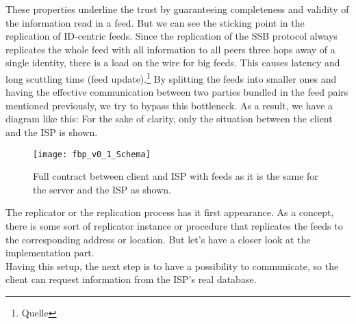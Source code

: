 These properties underline the trust by guaranteeing completeness and validity of the information read in a feed. But we can see the sticking point in the replication of ID-centric feeds. Since the replication of the SSB protocol always replicates the whole feed with all information to all peers three hops away of a single identity, there is a load on the wire for big feeds. This causes latency and long scuttling time (feed update).\footnote{Quelle} By splitting the feeds into smaller ones and having the effective communication between two parties bundled in the feed pairs mentioned previously, we try to bypass this bottleneck. As a result, we have a diagram like this: For the sake of clarity, only the situation between the client and the ISP is shown. 

\begin{figure}
    \centering
    \texttt{[image: fbp\_v0\_1\_Schema]}
    \caption{Full contract between client and ISP with feeds as it is the same for the server and the ISP as shown.}
    \label{fig:contract_cli_isp}
\end{figure}
The replicator or the replication process has it first appearance. As a concept, there is some sort of replicator instance or procedure that replicates the feeds to the corresponding address or location. But let’s have a closer look at the implementation part. \\
Having this setup, the next step is to have a possibility to communicate, so the client can request information from the ISP’s real database.

\pagebreak
